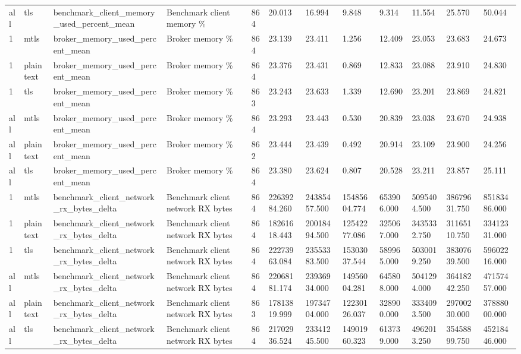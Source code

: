 \begin{longtable}{llllllllllll}
all & tls & benchmark\_client\_memory\_used\_percent\_mean & Benchmark client memory \% & 864 & 20.013 & 16.994 & 9.848 & 9.314 & 11.554 & 25.570 & 50.044 \\
1 & mtls & broker\_memory\_used\_percent\_mean & Broker memory \% & 864 & 23.139 & 23.411 & 1.256 & 12.409 & 23.053 & 23.683 & 24.673 \\
1 & plaintext & broker\_memory\_used\_percent\_mean & Broker memory \% & 864 & 23.376 & 23.431 & 0.869 & 12.833 & 23.088 & 23.910 & 24.830 \\
1 & tls & broker\_memory\_used\_percent\_mean & Broker memory \% & 863 & 23.243 & 23.633 & 1.339 & 12.690 & 23.201 & 23.869 & 24.821 \\
all & mtls & broker\_memory\_used\_percent\_mean & Broker memory \% & 864 & 23.293 & 23.443 & 0.530 & 20.839 & 23.038 & 23.670 & 24.938 \\
all & plaintext & broker\_memory\_used\_percent\_mean & Broker memory \% & 862 & 23.444 & 23.439 & 0.492 & 20.914 & 23.109 & 23.900 & 24.256 \\
all & tls & broker\_memory\_used\_percent\_mean & Broker memory \% & 864 & 23.380 & 23.624 & 0.807 & 20.528 & 23.211 & 23.857 & 25.111 \\
1 & mtls & benchmark\_client\_network\_rx\_bytes\_delta & Benchmark client network RX bytes & 864 & 22639284.260 & 24385457.500 & 15485604.774 & 653906.000 & 5095404.500 & 38679631.750 & 85183486.000 \\
1 & plaintext & benchmark\_client\_network\_rx\_bytes\_delta & Benchmark client network RX bytes & 864 & 18261618.443 & 20018494.500 & 12542277.086 & 325067.000 & 3435332.750 & 31165110.750 & 33412331.000 \\
1 & tls & benchmark\_client\_network\_rx\_bytes\_delta & Benchmark client network RX bytes & 864 & 22273963.084 & 23553383.500 & 15303037.544 & 589965.000 & 5030019.250 & 38307639.500 & 59602216.000 \\
all & mtls & benchmark\_client\_network\_rx\_bytes\_delta & Benchmark client network RX bytes & 864 & 22068181.174 & 23936934.000 & 14956004.281 & 645808.000 & 5041294.000 & 36418242.250 & 47157457.000 \\
all & plaintext & benchmark\_client\_network\_rx\_bytes\_delta & Benchmark client network RX bytes & 863 & 17813819.999 & 19734704.000 & 12230126.037 & 328900.000 & 3334093.500 & 29700230.000 & 37888000.000 \\
all & tls & benchmark\_client\_network\_rx\_bytes\_delta & Benchmark client network RX bytes & 864 & 21702936.524 & 23341245.500 & 14901960.323 & 613739.000 & 4962013.250 & 35458899.750 & 45218446.000 \\

\end{longtable}
